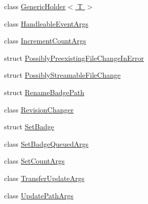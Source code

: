 \begin{DoxyCompactItemize}
class \hyperlink{class_cloud_api_public_1_1_model_1_1_generic_holder_3_01_t_01_4}{Generic\-Holder$<$ T $>$}
\item 
class \hyperlink{class_cloud_api_public_1_1_model_1_1_handleable_event_args}{Handleable\-Event\-Args}
\item 
class \hyperlink{class_cloud_api_public_1_1_model_1_1_increment_count_args}{Increment\-Count\-Args}
\item 
struct \hyperlink{struct_cloud_api_public_1_1_model_1_1_possibly_preexisting_file_change_in_error}{Possibly\-Preexisting\-File\-Change\-In\-Error}
\item 
struct \hyperlink{struct_cloud_api_public_1_1_model_1_1_possibly_streamable_file_change}{Possibly\-Streamable\-File\-Change}
\item 
struct \hyperlink{struct_cloud_api_public_1_1_model_1_1_rename_badge_path}{Rename\-Badge\-Path}
\item 
class \hyperlink{class_cloud_api_public_1_1_model_1_1_revision_changer}{Revision\-Changer}
\item 
struct \hyperlink{struct_cloud_api_public_1_1_model_1_1_set_badge}{Set\-Badge}
\item 
class \hyperlink{class_cloud_api_public_1_1_model_1_1_set_badge_queued_args}{Set\-Badge\-Queued\-Args}
\item 
class \hyperlink{class_cloud_api_public_1_1_model_1_1_set_count_args}{Set\-Count\-Args}
\item 
class \hyperlink{class_cloud_api_public_1_1_model_1_1_transfer_update_args}{Transfer\-Update\-Args}
\item 
class \hyperlink{class_cloud_api_public_1_1_model_1_1_update_path_args}{Update\-Path\-Args}
\end{DoxyCompactItemize}
